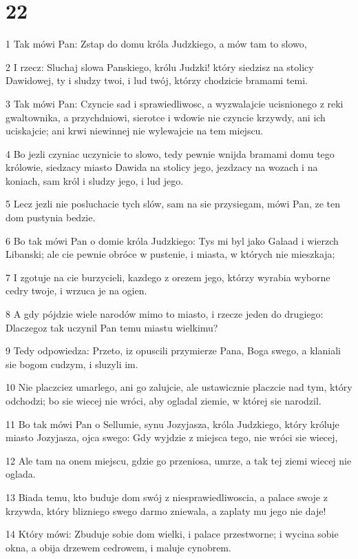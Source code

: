 \chapter{22}

\par 1 Tak mówi Pan: Zstap do domu króla Judzkiego, a mów tam to slowo,
\par 2 I rzecz: Sluchaj slowa Panskiego, królu Judzki! który siedzisz na stolicy Dawidowej, ty i sludzy twoi, i lud twój, którzy chodzicie bramami temi.
\par 3 Tak mówi Pan: Czyncie sad i sprawiedliwosc, a wyzwalajcie ucisnionego z reki gwaltownika, a przychdniowi, sierotce i wdowie nie czyncie krzywdy, ani ich uciskajcie; ani krwi niewinnej nie wylewajcie na tem miejscu.
\par 4 Bo jezli czyniac uczynicie to slowo, tedy pewnie wnijda bramami domu tego królowie, siedzacy miasto Dawida na stolicy jego, jezdzacy na wozach i na koniach, sam król i sludzy jego, i lud jego.
\par 5 Lecz jezli nie posluchacie tych slów, sam na sie przysiegam, mówi Pan, ze ten dom pustynia bedzie.
\par 6 Bo tak mówi Pan o domie króla Judzkiego: Tys mi byl jako Galaad i wierzch Libanski; ale cie pewnie obróce w pustenie, i miasta, w których nie mieszkaja;
\par 7 I zgotuje na cie burzycieli, kazdego z orezem jego, którzy wyrabia wyborne cedry twoje, i wrzuca je na ogien.
\par 8 A gdy pójdzie wiele narodów mimo to miasto, i rzecze jeden do drugiego: Dlaczegoz tak uczynil Pan temu miastu wielkimu?
\par 9 Tedy odpowiedza: Przeto, iz opuscili przymierze Pana, Boga swego, a klaniali sie bogom cudzym, i sluzyli im.
\par 10 Nie placzciez umarlego, ani go zalujcie, ale ustawicznie placzcie nad tym, który odchodzi; bo sie wiecej nie wróci, aby ogladal ziemie, w której sie narodzil.
\par 11 Bo tak mówi Pan o Sellumie, synu Jozyjasza, króla Judzkiego, który króluje miasto Jozyjasza, ojca swego: Gdy wyjdzie z miejsca tego, nie wróci sie wiecej,
\par 12 Ale tam na onem miejscu, gdzie go przeniosa, umrze, a tak tej ziemi wiecej nie oglada.
\par 13 Biada temu, kto buduje dom swój z niesprawiedliwoscia, a palace swoje z krzywda, który blizniego swego darmo zniewala, a zaplaty mu jego nie daje!
\par 14 Który mówi: Zbuduje sobie dom wielki, i palace przestworne; i wycina sobie okna, a obija drzewem cedrowem, i maluje cynobrem.
